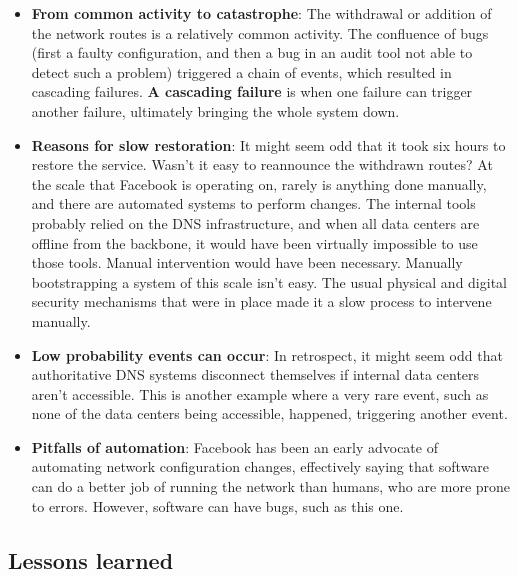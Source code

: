 \begin{itemize}
\item
\protect{}\label{Ska07B9X1Htxnvi5fmQXu}
\textbf{From common activity to catastrophe}: The withdrawal or addition of the network routes is a relatively common activity. The confluence of bugs (first a faulty configuration, and then a bug in an audit tool not able to detect such a problem) triggered a chain of events, which resulted in cascading failures. \textbf{A cascading failure} is when one failure can trigger another failure, ultimately bringing the whole system down.
\item
\protect{}\label{rPbjAdf05HNt9s0l77E0i}
\textbf{Reasons for slow restoration}: It might seem odd that it took six hours to restore the service. Wasn't it easy to reannounce the withdrawn routes? At the scale that Facebook is operating on, rarely is anything done manually, and there are automated systems to perform changes. The internal tools probably relied on the DNS infrastructure, and when all data centers are offline from the backbone, it would have been virtually impossible to use those tools. Manual intervention would have been necessary. Manually bootstrapping a system of this scale isn't easy. The usual physical and digital security mechanisms that were in place made it a slow process to intervene manually.
\item
\protect{}\label{TkCq7HmO1zYhYm77Yy_aE}
\textbf{Low probability events can occur}: In retrospect, it might seem odd that authoritative DNS systems disconnect themselves if internal data centers aren't accessible. This is another example where a very rare event, such as none of the data centers being accessible, happened, triggering another event.
\item
\protect{}\label{52CfpFSfydyBbnV2flOA_}
\textbf{Pitfalls of automation}: Facebook has been an early advocate of automating network configuration changes, effectively saying that software can do a better job of running the network than humans, who are more prone to errors. However, software can have bugs, such as this one.
\end{itemize}

\subsection{Lessons learned}\label{QdxxLP2lKeh1fPyYQmHKm}

